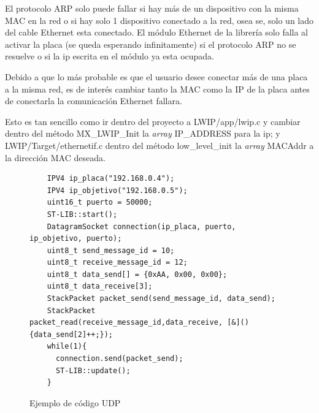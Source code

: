 \documentclass{report}
\begin{document}
\par \vspace{0.3cm}
El protocolo ARP solo puede fallar si hay más de un dispositivo con la misma MAC en la red o si hay solo 1 dispositivo conectado a la red, osea se, solo un lado del cable Ethernet esta conectado. El módulo Ethernet de la librería solo falla al activar la placa (se queda esperando infinitamente) si el protocolo ARP no se resuelve o si la ip escrita en el módulo ya esta ocupada. \par \vspace{0.3cm}
Debido a que lo más probable es que el usuario desee conectar más de una placa a la misma red, es de interés cambiar tanto la MAC como la IP de la placa antes de conectarla la comunicación Ethernet fallara. \par
Esto es tan sencillo como ir dentro del proyecto a LWIP/app/lwip.c y cambiar dentro del método MX\_LWIP\_Init la \textit{array} IP\_ADDRESS para la ip; y LWIP/Target/ethernetif.c dentro del método low\_level\_init la \textit{array} MACAddr a la dirección MAC deseada. 

\begin{figure}[h]
  \begin{lstlisting}
    IPV4 ip_placa("192.168.0.4");
    IPV4 ip_objetivo("192.168.0.5");
    uint16_t puerto = 50000;
    ST-LIB::start();
    DatagramSocket connection(ip_placa, puerto, ip_objetivo, puerto);
    uint8_t send_message_id = 10;
    uint8_t receive_message_id = 12;
    uint8_t data_send[] = {0xAA, 0x00, 0x00}; 
    uint8_t data_receive[3]; 
    StackPacket packet_send(send_message_id, data_send);
    StackPacket packet_read(receive_message_id,data_receive, [&](){data_send[2]++;});
    while(1){
      connection.send(packet_send);
      ST-LIB::update();
    }
  \end{lstlisting}
  \caption{Ejemplo de código UDP}
  \label{UDPcode}
\end{figure}
\par \vspace{0.3cm}
\end{document}
